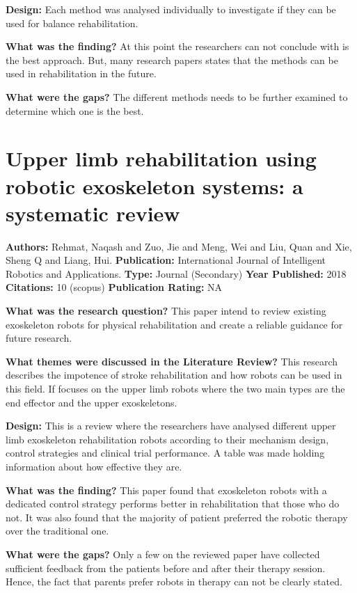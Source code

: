 \textbf{Design:}  
Each method was analysed individually to investigate if they can be used for balance rehabilitation. 

\textbf{What was the finding?} 
At this point the researchers can not conclude with is the best approach. But, many research papers states that the methods can be used in rehabilitation in the future. 

\textbf{What were the gaps?}   
The different methods needs to be further examined to determine which one is the best. 



\section{Upper limb rehabilitation using robotic exoskeleton systems: a systematic review} 
\textbf{Authors:} Rehmat, Naqash and Zuo, Jie and Meng, Wei and Liu, Quan and Xie, Sheng Q and Liang, Hui.  \newline
\textbf{Publication:} International Journal of Intelligent Robotics and Applications.
\textbf{Type:} Journal (Secondary) 
\textbf{Year Published:} 2018
\textbf{Citations:} 10 (scopus) \newline 
\textbf{Publication Rating:}  NA  

\textbf{What was the research question?} 
This paper intend to review existing exoskeleton robots for physical rehabilitation and create a reliable guidance for future research.  

\textbf{What themes were discussed in the Literature Review?}    
This research describes the impotence of stroke rehabilitation and how robots can be used in this field. If focuses on the upper limb robots where the two main types are the end effector and the upper exoskeletons. 

\textbf{Design:}  
This is a review where the researchers have analysed different upper limb exoskeleton rehabilitation robots according to their mechanism design, control strategies and clinical trial performance. A table was made holding information about how effective they are. 

\textbf{What was the finding?} 
This paper found that exoskeleton robots with a dedicated control strategy performs better in rehabilitation that those who do not. It was also found that the majority of patient preferred the robotic therapy over the traditional one.   

\textbf{What were the gaps?}   
Only a few on the reviewed paper have collected sufficient feedback from the patients before and after their therapy session. Hence, the fact that parents prefer robots in therapy can not be clearly stated.   


